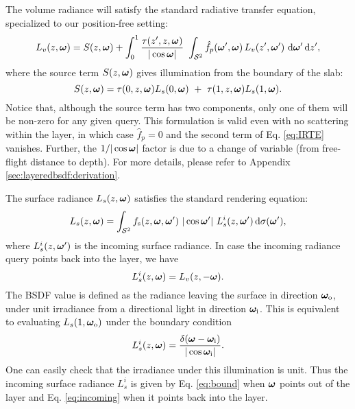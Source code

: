 The volume radiance will satisfy the standard radiative transfer equation, specialized to our position-free setting:
\begin{equation}
\label{eq:IRTE}
L_v(z, \bm\omega) = S(z, \bm\omega) + 
\int_0^1 \frac{\tau(z', z, \bm\omega)}{|\cos\bm\omega|} \, \, \int_{\mathcal{S}^2} \hat f_p(\bm\omega', \bm\omega) \, L_v(z', \bm\omega') \,\,\mathrm{d} \bm\omega' \,\mathrm{d} z',
\end{equation}
where the source term $S(z, \bm\omega)$ gives illumination from the boundary of the slab:
\begin{equation}
S(z, \bm\omega) = \tau(0, z, \bm\omega) L_s(0, \bm\omega) \ + \ \tau(1, z, \bm\omega) L_s(1, \bm\omega).
\end{equation}
Notice that, although the source term has two components, only one of them will be non-zero for any given query.
This formulation is valid even with no scattering within the layer, in which case $\hat f_p = 0$ and the second term of Eq. \eqref{eq:IRTE} vanishes.
Further, the $1/|\cos\bm\omega|$ factor is due to a change of variable (from free-flight distance to depth). For more details, please refer to Appendix \ref{sec:layeredbsdf:derivation}.

The surface radiance $L_s(z, \bm\omega)$ satisfies the standard rendering equation:
\begin{equation}
\label{eq:RE}
L_s(z, \bm\omega) = \int_{\mathcal{S}^2} f_\mathrm{s}(z, \bm\omega, \bm\omega') \ |\cos \bm\omega'| \ L_s^i(z, \bm\omega') \,\mathrm{d} \sigma(\bm\omega'),
\end{equation}
where $L_s^i(z, \bm\omega')$ is the incoming surface radiance. In case the incoming radiance query points back into the layer, we have
\begin{equation}
\label{eq:incoming}
L_s^i(z, \bm\omega) = L_v(z, -\bm\omega).
\end{equation}
The BSDF value is defined as the radiance leaving the surface in direction $\bm\omega_\mathrm{o}$, under unit irradiance from a directional light in direction $\bm\omega_\mathrm{i}$. This is equivalent to evaluating $L_s(1, \bm\omega_\mathrm{o})$ under the boundary condition
\begin{equation}
	\label{eq:bound}
	L_s^i(z, \bm\omega) = \frac{\delta(\bm\omega - \bm\omega_\mathrm{i})}{|\cos \bm\omega_\mathrm{i}|}.
\end{equation}
One can easily check that the irradiance under this illumination is unit. Thus the incoming surface radiance $L^i_s$ is given by Eq. \eqref{eq:bound} when $\bm\omega$ points out of the layer and Eq. \eqref{eq:incoming} when it points back into the layer.

